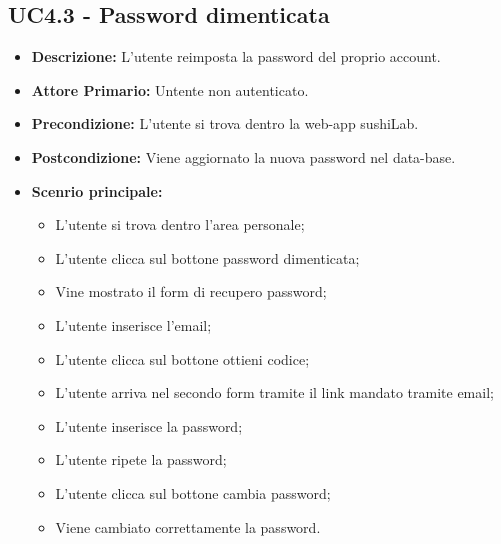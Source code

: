 \subsection{UC4.3 - Password dimenticata}
\begin{itemize}
    \item \textbf{Descrizione:} L'utente reimposta la password del proprio account.
    \item \textbf{Attore Primario:} Untente non autenticato.
    \item \textbf{Precondizione:} L'utente si trova dentro la web-app sushiLab.
    \item \textbf{Postcondizione:} Viene aggiornato la nuova password nel data-base.
    \item \textbf{Scenrio principale:}
    \begin{itemize}
        \item L'utente si trova dentro l'area personale;
        \item L'utente clicca sul bottone password dimenticata;
        \item Vine mostrato il form di recupero password;
        \item L'utente inserisce l'email;
        \item L'utente clicca sul bottone ottieni codice;
        \item L'utente arriva nel secondo form tramite il link mandato tramite email;
        \item L'utente inserisce la password;
        \item L'utente ripete la password;
        \item L'utente clicca sul bottone cambia password;
        \item Viene cambiato correttamente la password.
    \end{itemize}
\end{itemize}
